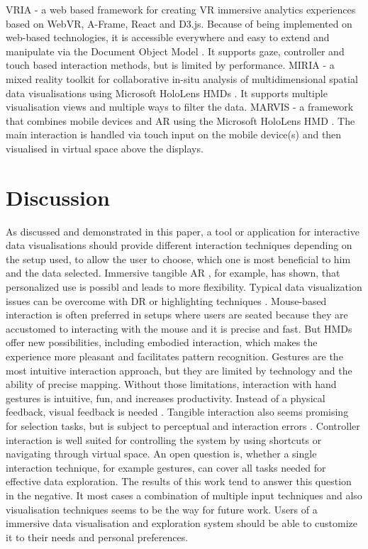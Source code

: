 VRIA - a web based framework for creating \ac{VR} immersive analytics experiences based on WebVR, A-Frame, React and D3.js. Because of being implemented on web-based technologies, it is accessible everywhere and easy to extend and manipulate via the Document Object Model \autocite[]{Butcher2020}. It supports gaze, controller and touch based interaction methods, but is limited by performance.\newline
MIRIA - a mixed reality toolkit for collaborative in-situ analysis of multidimensional spatial data visualisations using Microsoft HoloLens \ac{HMD}s \autocite[]{Buschel2021}. It supports multiple visualisation views and multiple ways to filter the data. \newline
MARVIS - a framework that combines mobile devices and \ac{AR} using the Microsoft HoloLens \ac{HMD} \autocite[]{Langner2021}. The main interaction is handled via touch input on the mobile device(s) and then visualised in virtual space above the displays.
\section{Discussion}
As discussed and demonstrated in this paper, a tool or application for interactive data visualisations should provide different interaction techniques depending on the setup used, to allow the user to choose, which one is most beneficial to him and the data selected. Immersive tangible AR \autocite[]{Bach2018}, for example, has shown, that personalized use is possibl and leads to more flexibility. Typical data visualization issues can be overcome with \ac{DR} or highlighting techniques \autocite[]{Prouzeau2019}. Mouse-based interaction is often preferred in setups where users are seated because they are accustomed to interacting with the mouse and it is precise and fast. But \ac{HMD}s offer new possibilities, including embodied interaction, which makes the experience more pleasant and facilitates pattern recognition. Gestures are the most intuitive interaction approach, but they are limited by technology and the ability of precise mapping. Without those limitations, interaction with hand gestures is intuitive, fun, and increases productivity. Instead of a physical feedback, visual feedback is needed \autocite[]{Theart2017}. Tangible interaction also seems promising for selection tasks, but is subject to perceptual and interaction errors \autocite[]{Bach2018}. Controller interaction is well suited for controlling the system by using shortcuts or navigating through virtual space.\newline
An open question is, whether a single interaction technique, for example gestures, can cover all tasks needed for effective data exploration. The results of this work tend to answer this question in the negative. It most cases a combination of multiple input techniques and also visualisation techniques seems to be the way for future work. Users of a immersive data visualisation and exploration system should be able to customize it to their needs and personal preferences.

